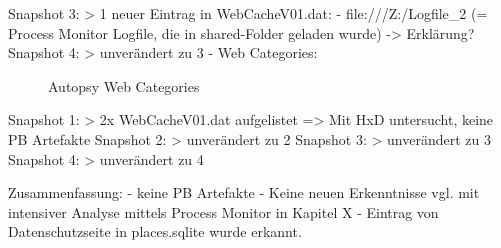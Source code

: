 	Snapshot 3:
		> 1 neuer Eintrag in WebCacheV01.dat:
			- file:///Z:/Logfile\_2 (= Process Monitor Logfile, die in shared-Folder geladen wurde) -> Erklärung?
	Snapshot 4:
		> unverändert zu 3
- Web Categories:
	\begin{figure}[h!]
		\centerline{}
		\label{chart:final-criteria}  
		\caption{Autopsy Web Categories}
	\end{figure}
	Snapshot 1:
		> 2x WebCacheV01.dat aufgelistet => Mit HxD untersucht, keine PB Artefakte
	Snapshot 2:
		> unverändert zu 2
	Snapshot 3:
		> unverändert zu 3
	Snapshot 4:
		> unverändert zu 4
		
Zusammenfassung:
- keine PB Artefakte
- Keine neuen Erkenntnisse vgl. mit intensiver Analyse mittels Process Monitor in Kapitel X
- Eintrag von Datenschutzseite in places.sqlite wurde erkannt.


